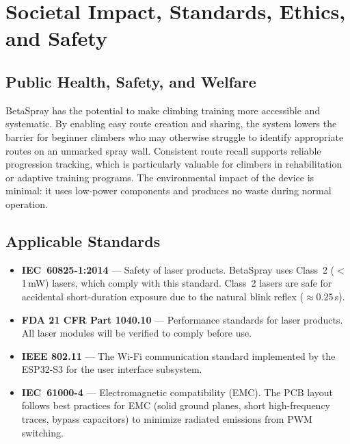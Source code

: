 \documentclass[12pt]{extarticle}
\begin{document}
\newpage
\section{Societal Impact, Standards, Ethics, and Safety}

\subsection{Public Health, Safety, and Welfare}

BetaSpray has the potential to make climbing training more accessible and systematic. By
enabling easy route creation and sharing, the system lowers the barrier for beginner climbers
who may otherwise struggle to identify appropriate routes on an unmarked spray wall. Consistent
route recall supports reliable progression tracking, which is particularly valuable for climbers
in rehabilitation or adaptive training programs. The environmental impact of the device is
minimal: it uses low-power components and produces no waste during normal operation.

\subsection{Applicable Standards}

\begin{itemize}
    \item \textbf{IEC~60825-1:2014} --- Safety of laser products. BetaSpray uses Class~2
    ($<$1\,mW) lasers, which comply with this standard. Class~2 lasers are safe for accidental
    short-duration exposure due to the natural blink reflex ($\approx$0.25\,s).

    \item \textbf{FDA 21 CFR Part 1040.10} --- Performance standards for laser products. All
    laser modules will be verified to comply before use.

    \item \textbf{IEEE 802.11} --- The Wi-Fi communication standard implemented by the
    ESP32-S3 for the user interface subsystem.

    \item \textbf{IEC~61000-4} --- Electromagnetic compatibility (EMC). The PCB layout follows
    best practices for EMC (solid ground planes, short high-frequency traces, bypass
    capacitors) to minimize radiated emissions from PWM switching.

\end{itemize}
\end{document}
